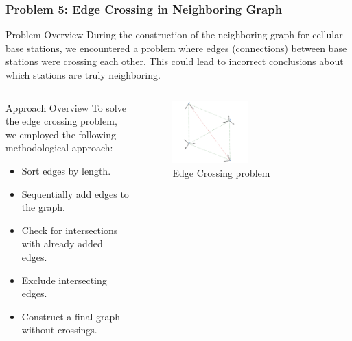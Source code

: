 \begin{frame}
    \frametitle{Problem 5: Edge Crossing in Neighboring Graph}

    \begin{block}{Problem Overview}
        During the construction of the neighboring graph for cellular base stations, we encountered a problem where edges (connections) between base stations were crossing each other. This could lead to incorrect conclusions about which stations are truly neighboring.
    \end{block}
    \begin{columns}
        \begin{column}{0.5\textwidth}
            \begin{block}{Approach Overview}
                To solve the edge crossing problem, we employed the following methodological approach:
                \begin{itemize}
                    \item Sort edges by length.
                    \item Sequentially add edges to the graph.
                    \item Check for intersections with already added edges.
                    \item Exclude intersecting edges.
                    \item Construct a final graph without crossings.
                \end{itemize}
            \end{block}
        \end{column}
        \begin{column}{0.5\textwidth}
            \begin{figure}
                \includegraphics[width=0.5\textwidth]{images/Altair/edge_crossing_problem.png}  
                \caption{Edge Crossing problem}
            \end{figure}
        \end{column}
    \end{columns}
\end{frame}



